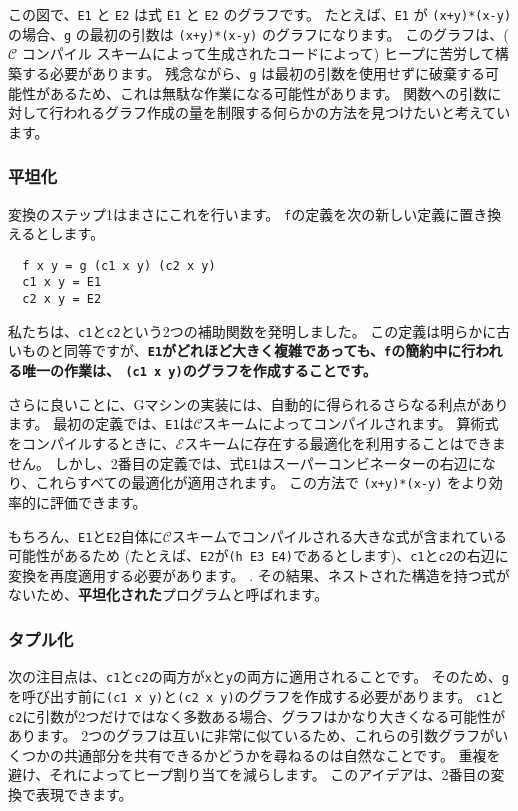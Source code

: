 \documentclass{jarticle}
\begin{document}
この図で、\texttt{E1} と \texttt{E2} は式 \texttt{E1} と \texttt{E2} のグラフです。
たとえば、\texttt{E1} が \texttt{(x+y)*(x-y)} の場合、\texttt{g} の最初の引数は \texttt{(x+y)*(x-y)} のグラフになります。
このグラフは、($\mathcal{C}$ コンパイル スキームによって生成されたコードによって) ヒープに苦労して構築する必要があります。
残念ながら、\texttt{g} は最初の引数を使用せずに破棄する可能性があるため、これは無駄な作業になる可能性があります。
関数への引数に対して行われるグラフ作成の量を制限する何らかの方法を見つけたいと考えています。

\subsubsection{平坦化}

変換のステップ1はまさにこれを行います。
\texttt{f}の定義を次の新しい定義に置き換えるとします。

\begin{verbatim}
  f x y = g (c1 x y) (c2 x y)
  c1 x y = E1
  c2 x y = E2
\end{verbatim}

私たちは、\texttt{c1}と\texttt{c2}という2つの補助関数を発明しました。
この定義は明らかに古いものと同等ですが、\textbf{\texttt{E1}がどれほど大きく複雑であっても、\texttt{f}の簡約中に行われる唯一の作業は、
	\texttt{(c1 x y)}のグラフを作成することです。}

さらに良いことに、Gマシンの実装には、自動的に得られるさらなる利点があります。
最初の定義では、\texttt{E1}は$\mathcal{C}$スキームによってコンパイルされます。
算術式をコンパイルするときに、$\mathcal{E}$スキームに存在する最適化を利用することはできません。
しかし、2番目の定義では、式\texttt{E1}はスーパーコンビネーターの右辺になり、これらすべての最適化が適用されます。
この方法で \texttt{(x+y)*(x-y)} をより効率的に評価できます。

もちろん、\texttt{E1}と\texttt{E2}自体に$\mathcal{C}$スキームでコンパイルされる大きな式が含まれている可能性があるため
(たとえば、\texttt{E2}が\texttt{(h E3 E4)}であるとします)、\texttt{c1}と\texttt{c2}の右辺に変換を再度適用する必要があります。 .
その結果、ネストされた構造を持つ式がないため、\textbf{平坦化された}プログラムと呼ばれます。

\subsubsection{タプル化}

次の注目点は、\texttt{c1}と\texttt{c2}の両方が\texttt{x}と\texttt{y}の両方に適用されることです。
そのため、\texttt{g}を呼び出す前に\texttt{(c1 x y)}と\texttt{(c2 x y)}のグラフを作成する必要があります。
\texttt{c1}と\texttt{c2}に引数が2つだけではなく多数ある場合、グラフはかなり大きくなる可能性があります。
2つのグラフは互いに非常に似ているため、これらの引数グラフがいくつかの共通部分を共有できるかどうかを尋ねるのは自然なことです。
重複を避け、それによってヒープ割り当てを減らします。
このアイデアは、2番目の変換で表現できます。
\end{document}
